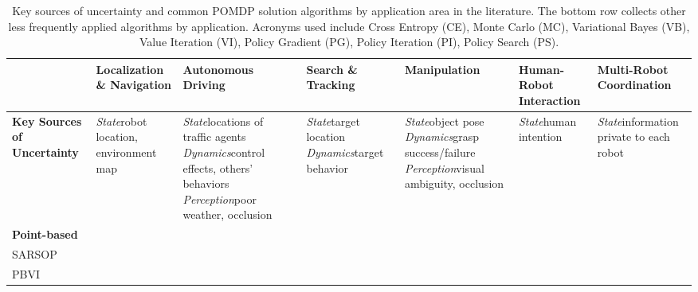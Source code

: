\documentclass[journal]{IEEEtran}
\begin{document}
\begin{table}[!t]
\centering
\caption{Key sources of uncertainty and common POMDP solution algorithms by application area in the literature.
The bottom row collects other less frequently applied algorithms by application.
Acronyms used include Cross Entropy (CE), Monte Carlo (MC), Variational Bayes (VB), Value Iteration (VI),
Policy Gradient (PG), Policy Iteration (PI), Policy Search (PS).}
\label{tab:algorithms_applications}
\begin{tabularx}{\textwidth}{LLLLLLL}
\toprule
 &
 \textbf{Localization \& Navigation} &
 \textbf{Autonomous Driving} &
 \textbf{Search \& Tracking} &
 \textbf{Manipulation} &
 \textbf{Human-Robot Interaction} &
 \textbf{Multi-Robot Coordination} \\
\midrule
 \textbf{Key Sources of Uncertainty} &
 \textit{State}\newline robot location, environment map &
 \textit{State}\newline locations of traffic agents\newline
 \textit{Dynamics}\newline control effects, others' behaviors
 \textit{Perception}\newline poor weather, occlusion &
 \textit{State}\newline target location \newline
 \textit{Dynamics}\newline target behavior &
 \textit{State}\newline object pose \newline
 \textit{Dynamics}\newline grasp success/failure \newline
 \textit{Perception}\newline visual ambiguity, occlusion &
 \textit{State}\newline human intention &
 \textit{State}\newline information private to each robot\\
\midrule
 \textbf{Point-based} \\ %
    \hspace{0.5em}SARSOP~\cite{kurniawati2008sarsop} &
    &
    &
    \cite{gupta2017decision,atanasov2014nonmyopic} &
    \cite{monso2012pomdp,horowitz2013interactive,koval2016pre} &
    \cite{schmidt2010learning,chen2018planning,petric2019hierarchical} &
    \\ %
    \hspace{0.5em}PBVI~\cite{pineau2006anytime} &

\end{tabularx}
\end{table}
\end{document}
